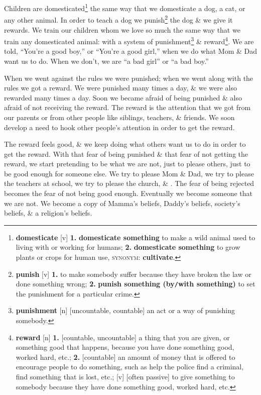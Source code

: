 \documentclass[oneside]{book}
\numberwithin{equation}{section}
\begin{document}
Children are domesticated\footnote{\textbf{domesticate} [v] \textbf{1.} \textbf{domesticate something} to make a wild animal used to living with or working for humans; \textbf{2.} \textbf{domesticate something} to grow plants or crops for human use, \textsc{synonym}: \textbf{cultivate}.} the same way that we domesticate a dog, a cat, or any other animal. In order to teach a dog we punish\footnote{\textbf{punish} [v] \textbf{1.} to make somebody suffer because they have broken the law or done something wrong; \textbf{2.} \textbf{punish something (by\texttt{/}with something)} to set the punishment for a particular crime.} the dog \& we give it rewards. We train our children whom we love so much the same way that we train any domesticated animal: with a system of punishment\footnote{\textbf{punishment} [n] [uncountable, countable] an act or a way of punishing somebody.} \& reward\footnote{\textbf{reward} [n] \textbf{1.} [countable, uncountable] a thing that you are given, or something good that happens, because you have done something good, worked hard, etc.; \textbf{2.} [countable] an amount of money that is offered to encourage people to do something, such as help the police find a criminal, find something that is lost, etc.; [v] [often passive] to give something to somebody because they have done something good, worked hard, etc.}. We are told, ``You're a good boy,'' or ``You're a good girl,'' when we do what Mom \& Dad want us to do. When we don't, we are ``a bad girl'' or ``a bad boy.''

When we went against the rules we were punished; when we went along with the rules we got a reward. We were punished many times a day, \& we were also rewarded many times a day. Soon we became afraid of being punished \& also afraid of not receiving the reward. The reward is the attention that we got from our parents or from other people like siblings, teachers, \& friends. We soon develop a need to hook other people's attention in order to get the reward.

The reward feels good, \& we keep doing what others want us to do in order to get the reward. With that fear of being punished \& that fear of not getting the reward, we start pretending to be what we are not, just to please others, just to be good enough for someone else. We try to please Mom \& Dad, we try to please the teachers at school, we try to please the church, \& .  The fear of being rejected becomes the fear of not being good enough. Eventually we become someone that we are not. We become a copy of Mamma's beliefs, Daddy's beliefs, society's beliefs, \& a religion's beliefs.
\end{document}
